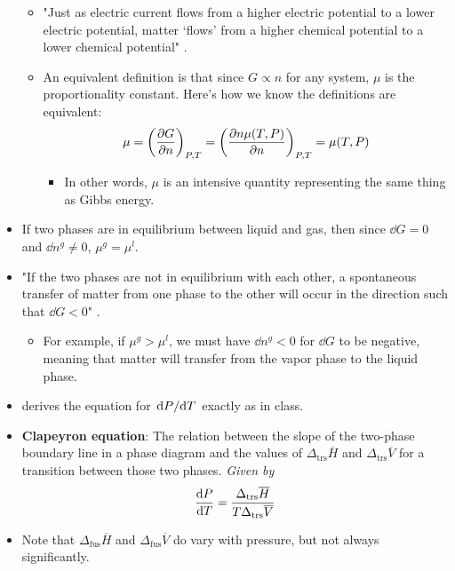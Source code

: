 \documentclass[../notes.tex]{subfiles}
\begin{document}
\begin{itemize}
\begin{itemize}
        \item "Just as electric current flows from a higher electric potential to a lower electric potential, matter `flows' from a higher chemical potential to a lower chemical potential" \parencite[937]{bib:McQuarrieSimon}.
        \item An equivalent definition is that since $G\propto n$ for any system, $\mu$ is the proportionality constant. Here's how we know the definitions are equivalent:
        \begin{equation*}
            \mu = \left( \pdv{G}{n} \right)_{P,T}
            = \left( \pdv{n\mu(T,P)}{n} \right)_{P,T}
            = \mu(T,P)
        \end{equation*}
        \begin{itemize}
            \item In other words, $\mu$ is an intensive quantity representing the same thing as Gibbs energy.
        \end{itemize}
    \end{itemize}
    \item If two phases are in equilibrium between liquid and gas, then since $\dd{G}=0$ and $\dd{n^g}\neq 0$, $\mu^g=\mu^l$.
    \item "If the two phases are not in equilibrium with each other, a spontaneous transfer of matter from one phase to the other will occur in the direction such that $\dd{G}<0$" \parencite[937]{bib:McQuarrieSimon}.
    \begin{itemize}
        \item For example, if $\mu^g>\mu^l$, we must have $\dd{n^g}<0$ for $\dd{G}$ to be negative, meaning that matter will transfer from the vapor phase to the liquid phase.
    \end{itemize}
    \item \textcite{bib:McQuarrieSimon} derives the equation for $\dv*{P}{T}$ exactly as in class.
    \item \textbf{Clapeyron equation}: The relation between the slope of the two-phase boundary line in a phase diagram and the values of $\Delta_\text{trs}\overline{H}$ and $\Delta_\text{trs}\overline{V}$ for a transition between those two phases. \emph{Given by}
    \begin{equation*}
        \dv{P}{T} = \frac{\Delta_\text{trs}\overline{H}}{T\Delta_\text{trs}\overline{V}}
    \end{equation*}
    \item Note that $\Delta_\text{fus}\overline{H}$ and $\Delta_\text{fus}\overline{V}$ do vary with pressure, but not always significantly.

\end{itemize}
\end{document}

